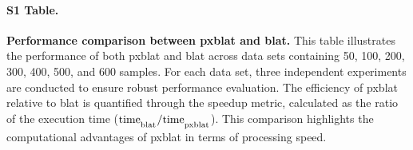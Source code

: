 \documentclass[10pt,letterpaper]{article}
\begin{document}
{%
%
%
%
%

\paragraph*{S1 Table.}
\label{S1_Table}
{\bf Performance comparison between \gls{pxblat} and \gls{blat}.}
This table illustrates the performance of both \gls{pxblat} and \gls{blat} across data sets containing \num{50},  \num{100}, \num{200}, \num{300}, \num{400}, \num{500}, and \num{600} samples.
For each data set, three independent experiments are conducted to ensure robust performance evaluation.
The efficiency of \gls{pxblat} relative to \gls{blat} is quantified through the speedup metric, calculated as the ratio of the execution time (\(\mathrm{time}_\textsubscript{blat} / \mathrm{time}_\textsubscript{pxblat}\)).
This comparison highlights the computational advantages of \gls{pxblat} in terms of processing speed.

}
\end{document}

